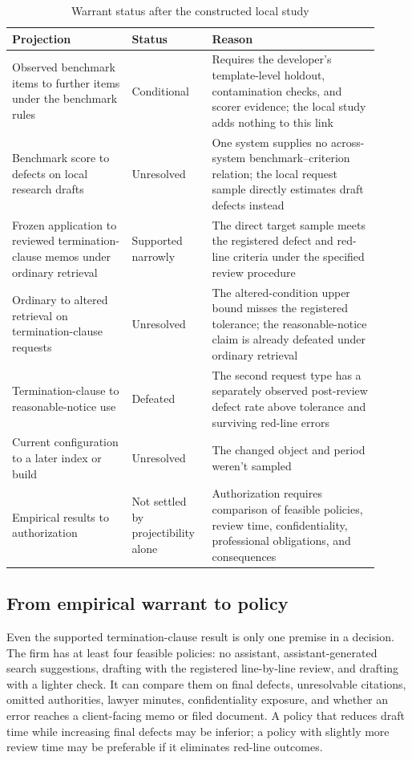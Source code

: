 \documentclass[12pt]{article}
\begin{document}
\begin{table}[tbp]
\centering\small
\caption{Warrant status after the constructed local study}\label{tab:audit_status}
\begin{tabular}{@{}>{\raggedright\arraybackslash}p{0.30\linewidth}
                    >{\raggedright\arraybackslash}p{0.19\linewidth}
                    >{\raggedright\arraybackslash}p{0.42\linewidth}@{}}
\toprule
Projection & Status & Reason \\
\midrule
Observed benchmark items to further items under the benchmark rules & Conditional & Requires the developer's template-level holdout, contamination checks, and scorer evidence; the local study adds nothing to this link \\
Benchmark score to defects on local research drafts & Unresolved & One system supplies no across-system benchmark--criterion relation; the local request sample directly estimates draft defects instead \\
Frozen application to reviewed termination-clause memos under ordinary retrieval & Supported narrowly & The direct target sample meets the registered defect and red-line criteria under the specified review procedure \\
Ordinary to altered retrieval on termination-clause requests & Unresolved & The altered-condition upper bound misses the registered tolerance; the reasonable-notice claim is already defeated under ordinary retrieval \\
Termination-clause to reasonable-notice use & Defeated & The second request type has a separately observed post-review defect rate above tolerance and surviving red-line errors \\
Current configuration to a later index or build & Unresolved & The changed object and period weren't sampled \\
Empirical results to authorization & Not settled by projectibility alone & Authorization requires comparison of feasible policies, review time, confidentiality, professional obligations, and consequences \\
\bottomrule
\end{tabular}
\end{table}

\subsection{From empirical warrant to policy}\label{ssec:legal_policy}

Even the supported termination-clause result is only one premise in a decision. The firm has at least four feasible policies: no assistant, assistant-generated search suggestions, drafting with the registered line-by-line review, and drafting with a lighter check. It can compare them on final defects, unresolvable citations, omitted authorities, lawyer minutes, confidentiality exposure, and whether an error reaches a client-facing memo or filed document. A policy that reduces draft time while increasing final defects may be inferior; a policy with slightly more review time may be preferable if it eliminates red-line outcomes.
\end{document}
